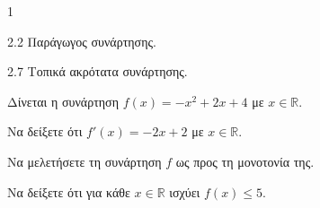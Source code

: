 \begin{ylh}{1}
    \item 2.2 Παράγωγος συνάρτησης.
    \item 2.7 Τοπικά ακρότατα συνάρτησης.
\end{ylh}
Δίνεται η συνάρτηση $f(x) = -x^2+2x+4$ με $x \in \mathbb{R}$.
\begin{alist}
    \item Να δείξετε ότι $f'(x)=-2x+2$ με $x \in \mathbb{R}$. 
    \item Να μελετήσετε τη συνάρτηση $f$ ως προς τη μονοτονία της. 
    \item Να δείξετε ότι για κάθε $x \in \mathbb{R}$ ισχύει $f(x) \le 5$. 
\end{alist}


